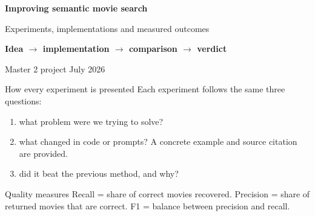 \documentclass[aspectratio=169,10pt]{beamer}
\begin{document}
\begin{frame}[plain]
\vspace{1.05cm}\hspace{2.3cm}\begin{minipage}{.70\textwidth}
{\LARGE\bfseries Improving semantic movie search}\par\vspace{.45em}
{\large Experiments, implementations and measured outcomes}\par\vspace{1.4em}
{\color{yellow}\bfseries Idea $\rightarrow$ implementation $\rightarrow$ comparison $\rightarrow$ verdict}\par\vspace{1.6em}
{\small Master 2 project \hfill July 2026}\end{minipage}
\end{frame}

\begin{frame}{How every experiment is presented}
Each experiment follows the same three questions:
\begin{enumerate}
\item {} what problem were we trying to solve?
\item {} what changed in code or prompts? A concrete example and source citation are provided.
\item {} did it beat the previous method, and why?
\end{enumerate}
\vfill
\begin{block}{Quality measures}
Recall = share of correct movies recovered. Precision = share of returned movies that are correct. F1 = balance between precision and recall.
\end{block}
\end{frame}
\end{document}
